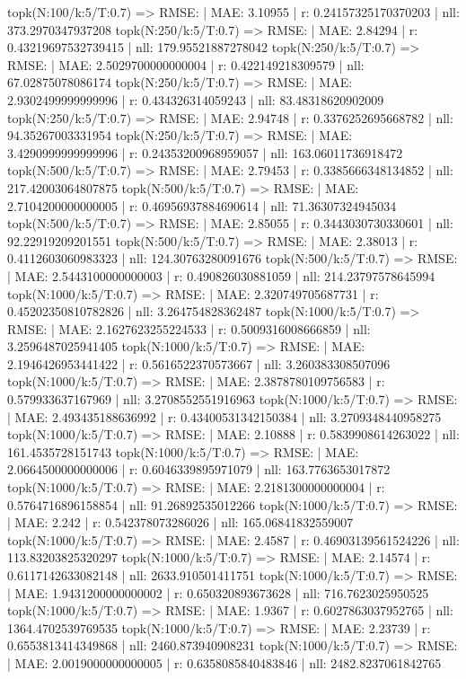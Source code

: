topk(N:100/k:5/T:0.7) => RMSE: | MAE: 3.10955 | r: 0.24157325170370203 | nll: 373.2970347937208
topk(N:250/k:5/T:0.7) => RMSE: | MAE: 2.84294 | r: 0.43219697532739415 | nll: 179.95521887278042
topk(N:250/k:5/T:0.7) => RMSE: | MAE: 2.5029700000000004 | r: 0.422149218309579 | nll: 67.02875078086174
topk(N:250/k:5/T:0.7) => RMSE: | MAE: 2.9302499999999996 | r: 0.434326314059243 | nll: 83.48318620902009
topk(N:250/k:5/T:0.7) => RMSE: | MAE: 2.94748 | r: 0.3376252695668782 | nll: 94.35267003331954
topk(N:250/k:5/T:0.7) => RMSE: | MAE: 3.4290999999999996 | r: 0.24353200968959057 | nll: 163.06011736918472
topk(N:500/k:5/T:0.7) => RMSE: | MAE: 2.79453 | r: 0.3385666348134852 | nll: 217.42003064807875
topk(N:500/k:5/T:0.7) => RMSE: | MAE: 2.7104200000000005 | r: 0.46956937884690614 | nll: 71.36307324945034
topk(N:500/k:5/T:0.7) => RMSE: | MAE: 2.85055 | r: 0.3443030730330601 | nll: 92.22919209201551
topk(N:500/k:5/T:0.7) => RMSE: | MAE: 2.38013 | r: 0.4112603060983323 | nll: 124.30763280091676
topk(N:500/k:5/T:0.7) => RMSE: | MAE: 2.5443100000000003 | r: 0.490826030881059 | nll: 214.23797578645994
topk(N:1000/k:5/T:0.7) => RMSE: | MAE: 2.320749705687731 | r: 0.45202350810782826 | nll: 3.264754828362487
topk(N:1000/k:5/T:0.7) => RMSE: | MAE: 2.1627623255224533 | r: 0.5009316008666859 | nll: 3.2596487025941405
topk(N:1000/k:5/T:0.7) => RMSE: | MAE: 2.1946426953441422 | r: 0.5616522370573667 | nll: 3.260383308507096
topk(N:1000/k:5/T:0.7) => RMSE: | MAE: 2.3878780109756583 | r: 0.579933637167969 | nll: 3.2708552551916963
topk(N:1000/k:5/T:0.7) => RMSE: | MAE: 2.493435188636992 | r: 0.43400531342150384 | nll: 3.2709348440958275
topk(N:1000/k:5/T:0.7) => RMSE: | MAE: 2.10888 | r: 0.5839908614263022 | nll: 161.4535728151743
topk(N:1000/k:5/T:0.7) => RMSE: | MAE: 2.0664500000000006 | r: 0.6046339895971079 | nll: 163.7763653017872
topk(N:1000/k:5/T:0.7) => RMSE: | MAE: 2.2181300000000004 | r: 0.5764716896158854 | nll: 91.26892535012266
topk(N:1000/k:5/T:0.7) => RMSE: | MAE: 2.242 | r: 0.542378073286026 | nll: 165.06841832559007
topk(N:1000/k:5/T:0.7) => RMSE: | MAE: 2.4587 | r: 0.46903139561524226 | nll: 113.83203825320297
topk(N:1000/k:5/T:0.7) => RMSE: | MAE: 2.14574 | r: 0.6117142633082148 | nll: 2633.910501411751
topk(N:1000/k:5/T:0.7) => RMSE: | MAE: 1.9431200000000002 | r: 0.650320893673628 | nll: 716.7623025950525
topk(N:1000/k:5/T:0.7) => RMSE: | MAE: 1.9367 | r: 0.6027863037952765 | nll: 1364.4702539769535
topk(N:1000/k:5/T:0.7) => RMSE: | MAE: 2.23739 | r: 0.6553813414349868 | nll: 2460.873940908231
topk(N:1000/k:5/T:0.7) => RMSE: | MAE: 2.0019000000000005 | r: 0.6358085840483846 | nll: 2482.8237061842765
